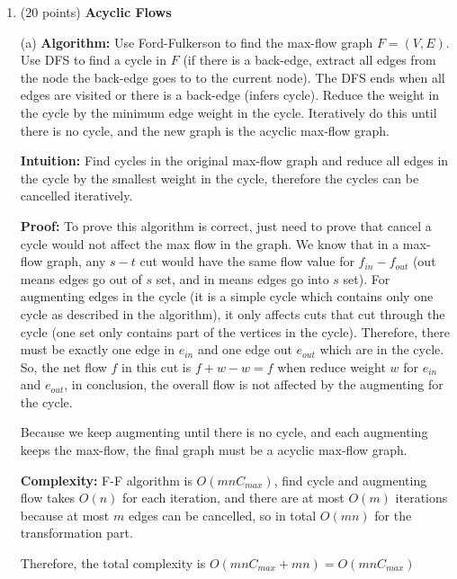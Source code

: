 \documentclass{article}
\newcommand{\algorithm}{\textbf{Algorithm:} }
\newcommand{\proof}{\textbf{Proof:} }
\newcommand{\intuition}{\textbf{Intuition:} }
\newcommand{\complexity}{\textbf{Complexity:} }
\begin{document}
\begin{enumerate}[topsep=0pt]
\complexity
The complexity of Capacity-scaling is $O(m^2)$, because $1+\lfloor C_{max}\rfloor=1+0=1$
The complexity of DFS is $O(m+n)$. Because we are searching a connected component, we have $n\le m+1$, so the complexity is $O(m+m+1)=O(m)$
The complexity of find all edges in $E'$ and extract $k$ edges is $O(m)$.

So, the total complexity is $O(m^2+m+m)=O(m^2)$

\item (20 points) \textbf{Acyclic Flows} 

(a) \algorithm
Use Ford-Fulkerson to find the max-flow graph $F=(V,E)$.
Use DFS to find a cycle in $F$ 
(if there is a back-edge, extract all edges from the node the back-edge goes to to the current node).
The DFS ends when all edges are visited or there is a back-edge (infers cycle).
Reduce the weight in the cycle by the minimum edge weight in the cycle.
Iteratively do this until there is no cycle, and the new graph is the acyclic max-flow graph.

\intuition
Find cycles in the original max-flow graph and reduce all edges in the cycle by the smallest weight in the cycle,
therefore the cycles can be cancelled iteratively.

\proof
To prove this algorithm is correct, just need to prove that cancel a cycle would not affect the max flow in the graph.
We know that in a max-flow graph, any $s-t$ cut would have the same flow value for $f_{in}-f_{out}$ 
(out means edges go out of $s$ set, and in means edges go into $s$ set).
For augmenting edges in the cycle (it is a simple cycle which contains only one cycle as described in the algorithm), 
it only affects cuts that cut through the cycle (one set only contains part of the vertices in the cycle).
Therefore, there must be exactly one edge in $e_{in}$ and one edge out $e_{out}$ which are in the cycle.
So, the net flow $f$ in this cut is $f+w-w=f$ when reduce weight $w$ for $e_{in}$ and $e_{out}$,
in conclusion, the overall flow is not affected by the augmenting for the cycle.

Because we keep augmenting until there is no cycle, and each augmenting keeps the max-flow,
the final graph must be a acyclic max-flow graph.

\complexity
F-F algorithm is $O(mnC_{max})$, find cycle and augmenting flow takes $O(n)$ for each iteration,
and there are at most $O(m)$ iterations because at most $m$ edges can be cancelled,
so in total $O(mn)$ for the transformation part.

Therefore, the total complexity is $O(mnC_{max}+mn)=O(mnC_{max})$


\end{enumerate}
\end{document}
